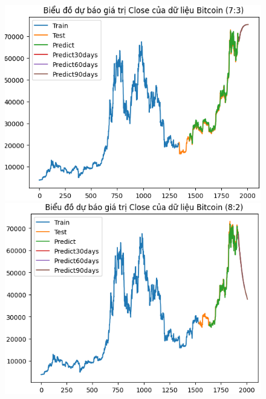 \documentclass[conference]{IEEEtran}
\begin{document}
\begin{figure}[H]
    \centering
    \begin{minipage}{0.15\textwidth}
    \centering
    \includegraphics[width=1\textwidth]{Figure/RNN_BTC73.png}
    \end{minipage}
    \hfill
    \begin{minipage}{0.15\textwidth}
    \centering
    \includegraphics[width=1\textwidth]{Figure/RNN_BTC82.png}
    \end{minipage}
    \hfill
    \begin{minipage}{0.15\textwidth}
    \centering

\end{minipage}
\end{figure}
\end{document}
